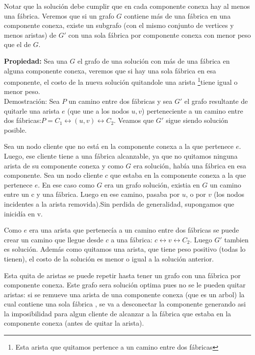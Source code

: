    \par{
    
    Notar que la solución debe cumplir que en cada componente conexa hay al menos una fábrica. Veremos que si un grafo $G$ contiene
    más de una fábrica en una componente conexa, existe un subgrafo (con el mismo conjunto de vertices y menos aristas)
    de $G'$ con una sola fábrica por componente conexa con menor peso que el de $G$.
    
    \textbf{Propiedad:} Sea una $G$ el grafo de una solución con más
    de una fábrica en alguna componente conexa, veremos que si hay una sola fábrica en esa componente, el costo de la nueva solución
    quitandole una arista \footnote{Esta arista que quitamos pertence a un camino entre dos fábricas}tiene igual o menor peso.\\
    
    Demostración:
    Sea $P$ un camino entre dos fábricas y sea $G'$ el grafo resultante de quitarle una arista $e$ (que une a los nodos $u,v$)
    perteneciente a un camino entre dos fábricas:$ P = C_1 \leftrightarrow (u,v) \leftrightarrow C_2$.
    Veamos que $G'$ sigue siendo solución posible.
    
    Sea un nodo cliente que no está en la componente conexa a la que pertenece $e$. Luego, ese cliente tiene a una fábrica alcanzable,
    ya que no quitamos ninguna arista de su componente conexa y como $G$ era solución, había una fábrica en esa componente.
    Sea un nodo cliente $c$ que estaba en la componente conexa a la que pertenece $e$.
    En ese caso como $G$ era un grafo solución, existia en $G$ un camino entre un c y una fábrica. Luego en ese camino, pasaba por
    $u$, o por $v$ (los nodos incidentes a la arista removida).Sin perdida de generalidad, supongamos que inicidía en v.
    
    Como $e$ era una arista que pertenecía a un camino entre dos fábricas se puede crear un camino
    que llegue desde $c$ a una fábrica: $ c \leftrightarrow v \leftrightarrow C_2$. Luego $G'$ tambien es solución.
    Además como quitamos una arista, que tiene peso positivo (todas lo tienen), el costo
    de la solución es menor o igual a la solución anterior.
    
    Esta quita de aristas se puede repetir hasta tener un grafo con una fábrica por componente conexa. Este grafo
    sera solución optima pues no se le pueden quitar aristas: si se remueve una arista de una componente conexa (que es un arbol) 
    la cual contiene una sola fábrica , se va a desconectar la componente generando asi la imposibilidad
    para algun cliente de alcanzar a la fábrica que estaba en la componente conexa (antes de quitar la arista).\\}

